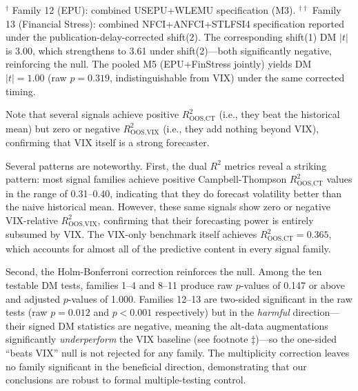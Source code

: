 \documentclass[12pt,a4paper]{article}
\begin{document}
\begin{table}[H]
\begin{threeparttable}
\begin{tablenotes}
\item $^{\dagger}$ Family 12 (EPU): combined USEPU+WLEMU specification (M3). $^{\dagger\dagger}$ Family 13 (Financial Stress): combined NFCI+ANFCI+STLFSI4 specification reported under the publication-delay-corrected shift(2). The corresponding shift(1) DM $|t|$ is 3.00, which strengthens to 3.61 under shift(2)---both significantly negative, reinforcing the null. The pooled M5 (EPU+FinStress jointly) yields DM $|t|=1.00$ (raw $p=0.319$, indistinguishable from VIX) under the same corrected timing.
\item Note that several signals achieve positive $R^2_{\text{OOS,CT}}$ (i.e., they beat the historical mean) but zero or negative $R^2_{\text{OOS,VIX}}$ (i.e., they add nothing beyond VIX), confirming that VIX itself is a strong forecaster.
\end{tablenotes}
\end{threeparttable}
\end{table}

Several patterns are noteworthy. First, the dual $R^2$ metrics reveal a striking pattern: most signal families achieve positive Campbell-Thompson $R^2_{\text{OOS,CT}}$ values in the range of 0.31--0.40, indicating that they do forecast volatility better than the naive historical mean. However, these same signals show zero or negative VIX-relative $R^2_{\text{OOS,VIX}}$, confirming that their forecasting power is entirely subsumed by VIX. The VIX-only benchmark itself achieves $R^2_{\text{OOS,CT}} = 0.365$, which accounts for almost all of the predictive content in every signal family.

Second, the Holm-Bonferroni correction reinforces the null. Among the ten testable DM tests, families 1--4 and 8--11 produce raw $p$-values of 0.147 or above and adjusted $p$-values of 1.000. Families 12--13 are two-sided significant in the raw tests (raw $p = 0.012$ and $p < 0.001$ respectively) but in the \emph{harmful} direction---their signed DM statistics are negative, meaning the alt-data augmentations significantly \emph{underperform} the VIX baseline (see footnote $\ddagger$)---so the one-sided ``beats VIX'' null is not rejected for any family. The multiplicity correction leaves no family significant in the beneficial direction, demonstrating that our conclusions are robust to formal multiple-testing control.
\end{document}
